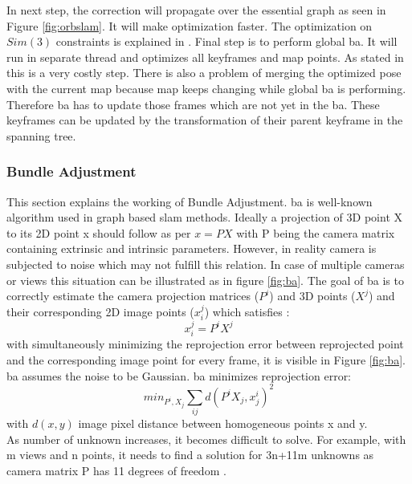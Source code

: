\newline 
In next step, the correction will propagate over the essential graph as seen in Figure \ref{fig:orbslam}. It will make optimization faster. The optimization on $ Sim(3)$  constraints is explained in \cite{Mur-Artal}. Final step is to perform global \acrshort{ba}. It will run in separate thread and optimizes all keyframes and map points. As stated in \cite{Mur-Artal} this is a very costly step. There is also a problem of merging the optimized pose with the current map because map keeps changing while global \acrshort{ba} is performing. Therefore \acrshort{ba} has to update those frames which are not yet in the \acrshort{ba}. These keyframes can be updated by the transformation of their parent keyframe in the spanning tree.

\subsubsection{Bundle Adjustment}
This section explains the working of Bundle Adjustment. \acrshort{ba} is well-known algorithm used in graph based \acrshort{slam} methods. Ideally a projection of 3D point X to its 2D point x should follow as per $ x = PX $ with P being the camera matrix containing extrinsic and intrinsic parameters. However, in reality camera is subjected to noise which may not fulfill this relation. In case of multiple cameras or views this situation can be illustrated as in figure \ref{fig:ba}. The goal of \acrshort{ba} is to correctly estimate the camera projection matrices ($ P^{i}$) and 3D points ($X^{j}$) and their corresponding 2D image points ($ x_{i}^{j} $) which satisfies :
\begin{equation*}
 x_{i}^{j} = P^{i}X^{j}
\end{equation*} 
with simultaneously minimizing the reprojection error between reprojected point and the corresponding image point for every frame, it is visible in Figure \ref{fig:ba}. \acrshort{ba} assumes the noise to be Gaussian. \acrshort{ba} minimizes reprojection error:
\begin{equation*}
 min_{P^{i},X_{j}} \sum_{ij} d(P^{i}X_{j},x_{j}^{i})^{2}
\end{equation*} 
with $ d(x,y) $ image pixel distance between homogeneous points x and y. \\
\newline 
As number of unknown increases, it becomes difficult to solve. For example, with m views and n points, it needs to find a solution for 3n+11m unknowns as camera matrix P has 11 degrees of freedom \cite{multiview_geometry}.

